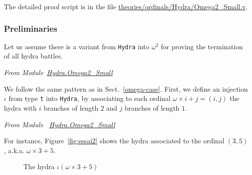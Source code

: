 The detailed  proof script is in the file
\href{https://github.com/coq-community/hydra-battles/blob/master/theories/ordinals/Hydra/Omega2_Small.v}{theories/ordinals/Hydra/Omega2\_Small.v}.

\subsubsection{Preliminaries}
Let us assume there is a variant from \texttt{Hydra} into $\omega^2$  for proving the   termination of all hydra battles.

\vspace{4pt}
\emph{From Module~\href{../theories/html/hydras.Hydra.Omega2_Small.html}{Hydra.Omega2\_Small}}






We  follow the same pattern as in Sect.~\ref{omega-case}.
First, we define an injection $\iota$ from type \texttt{t} into \texttt{Hydra}, by
 associating to  each ordinal $\omega\times i+ j = (i,j)$ the hydra with $i$ branches of length $2$ and
$j$ branches of length $1$.


\vspace{4pt}
\emph{From Module ~\href{../theories/html/hydras.Hydra.Omega2_Small.html\#iota}{Hydra.Omega2\_Small}}




For instance, Figure~\vref{fig:essai2} shows the hydra associated to the ordinal 
$(3,5)$, a.k.a. $\omega\times 3 + 5$.

\begin{figure}[htb]
\centering
{}
\caption{\label{fig:essai2}
The hydra $\iota(\omega\times 3+5)$}
\end{figure}




